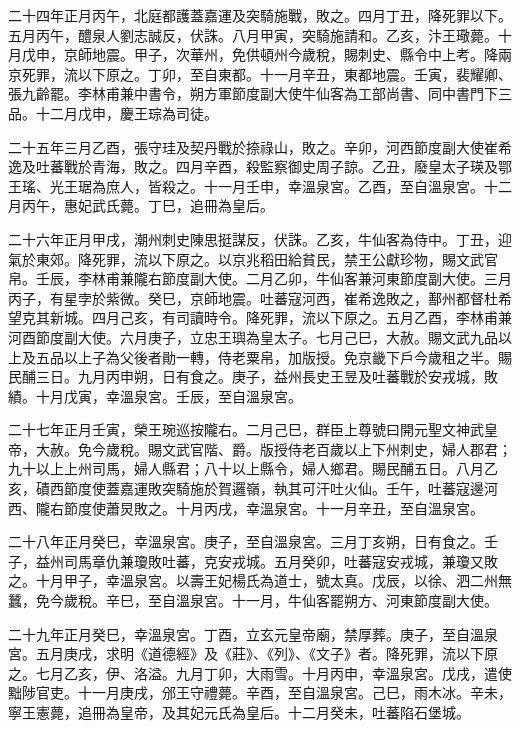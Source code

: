\begin{pinyinscope}
 二十四年正月丙午，北庭都護蓋嘉運及突騎施戰，敗之。四月丁丑，降死罪以下。五月丙午，醴泉人劉志誠反，伏誅。八月甲寅，突騎施請和。乙亥，汴王璥薨。十月戊申，京師地震。甲子，次華州，免供頓州今歲稅，賜刺史、縣令中上考。降兩京死罪，流以下原之。丁卯，至自東都。十一月辛丑，東都地震。壬寅，裴耀卿、張九齡罷。李林甫兼中書令，朔方軍節度副大使牛仙客為工部尚書、同中書門下三品。十二月戊申，慶王琮為司徒。



 二十五年三月乙酉，張守珪及契丹戰於捺祿山，敗之。辛卯，河西節度副大使崔希逸及吐蕃戰於青海，敗之。四月辛酉，殺監察御史周子諒。乙丑，廢皇太子瑛及鄂王瑤、光王琚為庶人，皆殺之。十一月壬申，幸溫泉宮。乙酉，至自溫泉宮。十二月丙午，惠妃武氏薨。丁巳，追冊為皇后。



 二十六年正月甲戌，潮州刺史陳思挺謀反，伏誅。乙亥，牛仙客為侍中。丁丑，迎氣於東郊。降死罪，流以下原之。以京兆稻田給貧民，禁王公獻珍物，賜文武官帛。壬辰，李林甫兼隴右節度副大使。二月乙卯，牛仙客兼河東節度副大使。三月丙子，有星孛於紫微。癸巳，京師地震。吐蕃寇河西，崔希逸敗之，鄯州都督杜希望克其新城。四月己亥，有司讀時令。降死罪，流以下原之。五月乙酉，李林甫兼河酉節度副大使。六月庚子，立忠王璵為皇太子。七月己巳，大赦。賜文武九品以上及五品以上子為父後者勛一轉，侍老粟帛，加版授。免京畿下戶今歲租之半。賜民酺三日。九月丙申朔，日有食之。庚子，益州長史王昱及吐蕃戰於安戎城，敗績。十月戊寅，幸溫泉宮。壬辰，至自溫泉宮。



 二十七年正月壬寅，榮王琬巡按隴右。二月己巳，群臣上尊號曰開元聖文神武皇帝，大赦。免今歲稅。賜文武官階、爵。版授侍老百歲以上下州刺史，婦人郡君；九十以上上州司馬，婦人縣君；八十以上縣令，婦人鄉君。賜民酺五日。八月乙亥，磧西節度使蓋嘉運敗突騎施於賀邏嶺，執其可汗吐火仙。壬午，吐蕃寇邊河西、隴右節度使蕭炅敗之。十月丙戌，幸溫泉宮。十一月辛丑，至自溫泉宮。



 二十八年正月癸巳，幸溫泉宮。庚子，至自溫泉宮。三月丁亥朔，日有食之。壬子，益州司馬章仇兼瓊敗吐蕃，克安戎城。五月癸卯，吐蕃寇安戎城，兼瓊又敗之。十月甲子，幸溫泉宮。以壽王妃楊氏為道士，號太真。戊辰，以徐、泗二州無蠶，免今歲稅。辛巳，至自溫泉宮。十一月，牛仙客罷朔方、河東節度副大使。



 二十九年正月癸巳，幸溫泉宮。丁酉，立玄元皇帝廟，禁厚葬。庚子，至自溫泉宮。五月庚戌，求明《道德經》及《莊》、《列》、《文子》者。降死罪，流以下原之。七月乙亥，伊、洛溢。九月丁卯，大雨雪。十月丙申，幸溫泉宮。戊戌，遣使黜陟官吏。十一月庚戌，邠王守禮薨。辛酉，至自溫泉宮。己巳，雨木冰。辛未，寧王憲薨，追冊為皇帝，及其妃元氏為皇后。十二月癸未，吐蕃陷石堡城。




\end{pinyinscope}
